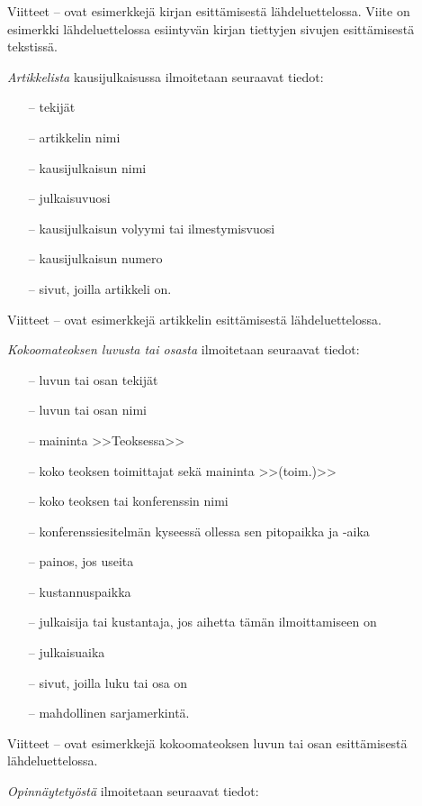 \documentclass[finnish, 12pt, a4paper, elec, utf8, a-1b, online]{aaltothesis}
\begin{document}
Viitteet \cite{Kauranen}--\cite{Koblitz} ovat esimerkkejä kirjan
esittämisestä lähdeluettelossa. Viite \cite[s.\ 83--124]{Koblitz} on
esimerkki lähdeluettelossa esiintyvän kirjan tiettyjen sivujen
esittämisestä tekstissä.

\textit{Artikkelista} kausijulkaisussa ilmoitetaan seuraavat tiedot:

\begin{itemize}

\item[--]tekijät
\item[--]artikkelin nimi
\item[--]kausijulkaisun nimi
\item[--]julkaisuvuosi
\item[--]kausijulkaisun volyymi tai ilmestymisvuosi
\item[--]kausijulkaisun numero
\item[--]sivut, joilla artikkeli on.
\end{itemize}

Viitteet \cite{bcs}--\cite{Deschamps} ovat esimerkkejä artikkelin
esittämisestä lähdeluettelossa.

\textit{Kokoomateoksen luvusta tai osasta} ilmoitetaan seuraavat tiedot:

\begin{itemize}
\item[--]luvun tai osan tekijät
\item[--]luvun tai osan nimi
\item[--]maininta >>Teoksessa>>
\item[--]koko teoksen toimittajat sekä maininta >>(toim.)>>
\item[--]koko teoksen tai konferenssin nimi
\item[--]konferenssiesitelmän kyseessä ollessa sen pitopaikka ja -aika
\item[--]painos, jos useita
\item[--]kustannuspaikka
\item[--]julkaisija tai kustantaja, jos aihetta tämän ilmoittamiseen on
\item[--]julkaisuaika
\item[--]sivut, joilla luku tai osa on
\item[--]mahdollinen sarjamerkintä.
\end{itemize}

Viitteet \cite{Sihvola}--\cite{Lindblom} ovat esimerkkejä
kokoomateoksen luvun tai osan esittämisestä lähdeluettelossa.

\textit{Opinnäytetyöstä} ilmoitetaan seuraavat tiedot:
\end{document}
